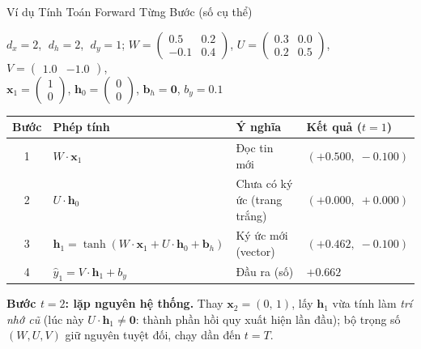 \documentclass[aspectratio=169, 10pt]{beamer}
\begin{document}
\begin{frame}{Ví dụ Tính Toán Forward Từng Bước (số cụ thể)}

\begin{center}
\small
$d_x = 2$, $\;d_h = 2$, $\;d_y = 1$;\quad
$W = \begin{pmatrix} 0.5 & 0.2 \\ -0.1 & 0.4 \end{pmatrix}$,\;
$U = \begin{pmatrix} 0.3 & 0.0 \\ 0.2 & 0.5 \end{pmatrix}$,\;
$V = \begin{pmatrix} 1.0 & -1.0 \end{pmatrix}$,\\[3pt]
$\mathbf{x}_1 = \begin{pmatrix} 1 \\ 0 \end{pmatrix}$,\;
$\mathbf{h}_0 = \begin{pmatrix} 0 \\ 0 \end{pmatrix}$,\;
$\mathbf{b}_h = \mathbf{0}$,\; $b_y = 0.1$
\end{center}

\vspace{0.1cm}
\begin{center}
\small
\setlength{\tabcolsep}{5pt}
\renewcommand{\arraystretch}{1.15}
\begin{tabular}{@{}clll@{}}
\toprule
\textbf{Bước} & \textbf{Phép tính} & \textbf{Ý nghĩa} & \textbf{Kết quả ($t = 1$)} \\
\midrule
1 & $W \cdot \mathbf{x}_1$ & Đọc tin mới & $(+0.500,\; -0.100)$ \\
2 & $U \cdot \mathbf{h}_0$ & Chưa có ký ức (trang trắng) & $(+0.000,\; +0.000)$ \\
\rowcolor{lightbg}
3 & $\mathbf{h}_1 = \tanh(W \cdot \mathbf{x}_1 + U \cdot \mathbf{h}_0 + \mathbf{b}_h)$ & Ký ức mới (vector) & \textcolor{accentteal}{$(+0.462,\; -0.100)$} \\
4 & $\hat{y}_1 = V \cdot \mathbf{h}_1 + b_y$ & Đầu ra (số) & \textcolor{warmorange}{$+0.662$} \\
\bottomrule
\end{tabular}
\end{center}

\vspace{0.1cm}
\textbf{Bước $t = 2$: lặp nguyên hệ thống.} Thay $\mathbf{x}_2 = (0,\, 1)$, lấy $\mathbf{h}_1$ vừa tính làm \emph{trí nhớ cũ} (lúc này $U \cdot \mathbf{h}_1 \neq \mathbf{0}$: thành phần hồi quy xuất hiện lần đầu); bộ trọng số $(W, U, V)$ giữ nguyên tuyệt đối, chạy dần đến $t = T$.


\end{frame}
\end{document}
